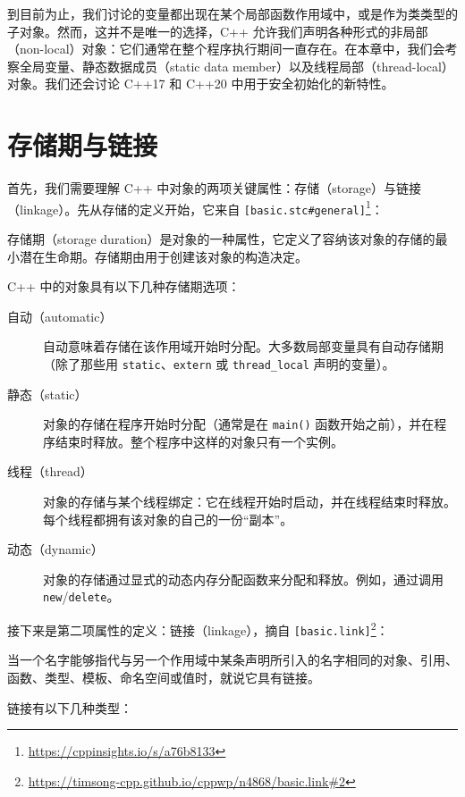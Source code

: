 到目前为止，我们讨论的变量都出现在某个局部函数作用域中，或是作为类类型的子对象。然而，这并不是唯一的选择，C++ 允许我们声明各种形式的非局部（non-local）对象：它们通常在整个程序执行期间一直存在。在本章中，我们会考察全局变量、静态数据成员（static data member）以及线程局部（thread-local）对象。我们还会讨论 C++17 和 C++20 中用于安全初始化的新特性。

\section{存储期与链接}

首先，我们需要理解 C++ 中对象的两项关键属性：存储（storage）与链接（linkage）。先从存储的定义开始，它来自 \texttt{[basic.stc\#general]}\footnote{\url{https://cppinsights.io/s/a76b8133}}：

\begin{myQuote}
存储期（storage duration）是对象的一种属性，它定义了容纳该对象的存储的最小潜在生命期。存储期由用于创建该对象的构造决定。
\end{myQuote}

C++ 中的对象具有以下几种存储期选项：

\begin{description}
\item[自动（automatic）] 自动意味着存储在该作用域开始时分配。大多数局部变量具有自动存储期（除了那些用 \texttt{static}、\texttt{extern} 或 \texttt{thread\_local} 声明的变量）。
\item[静态（static）] 对象的存储在程序开始时分配（通常是在 \texttt{main()} 函数开始之前），并在程序结束时释放。整个程序中这样的对象只有一个实例。
\item[线程（thread）] 对象的存储与某个线程绑定：它在线程开始时启动，并在线程结束时释放。每个线程都拥有该对象的自己的一份“副本”。
\item[动态（dynamic）] 对象的存储通过显式的动态内存分配函数来分配和释放。例如，通过调用 \texttt{new}/\texttt{delete}。
\end{description}

接下来是第二项属性的定义：链接（linkage），摘自 \texttt{[basic.link]}\footnote{\url{https://timsong-cpp.github.io/cppwp/n4868/basic.link\#2}}：

\begin{myQuote}
当一个名字能够指代与另一个作用域中某条声明所引入的名字相同的对象、引用、函数、类型、模板、命名空间或值时，就说它具有链接。
\end{myQuote}

链接有以下几种类型：

